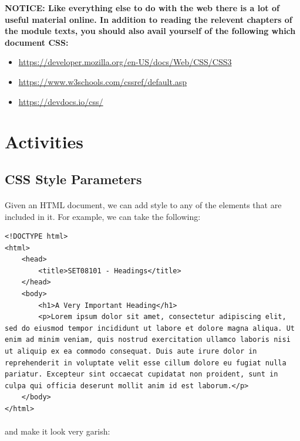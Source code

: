 \documentclass[10pt, a4paper, twosize]{article}
\begin{document}
\begin{framed}
{\bf{NOTICE:} Like everything else to do with the web there is a lot of useful material online. In addition to reading the relevent chapters of the module texts, you should also avail yourself of the following which document CSS:
\begin{itemize}
\item \url{https://developer.mozilla.org/en-US/docs/Web/CSS/CSS3}
\item \url{https://www.w3schools.com/cssref/default.asp}
\item \url{https://devdocs.io/css/}
\end{itemize}

}
\end{framed}


\section{Activities}

\subsection{CSS Style Parameters}
\paragraph{} Given an HTML document, we can add style to any of the elements that are included in it. For example, we can take the following:

\begin{lstlisting}
<!DOCTYPE html>
<html>
    <head>
        <title>SET08101 - Headings</title>
    </head>
    <body>
        <h1>A Very Important Heading</h1>
        <p>Lorem ipsum dolor sit amet, consectetur adipiscing elit, sed do eiusmod tempor incididunt ut labore et dolore magna aliqua. Ut enim ad minim veniam, quis nostrud exercitation ullamco laboris nisi ut aliquip ex ea commodo consequat. Duis aute irure dolor in reprehenderit in voluptate velit esse cillum dolore eu fugiat nulla pariatur. Excepteur sint occaecat cupidatat non proident, sunt in culpa qui officia deserunt mollit anim id est laborum.</p>
    </body>
</html>
\end{lstlisting}

\paragraph{} and make it look very garish:
\end{document}
